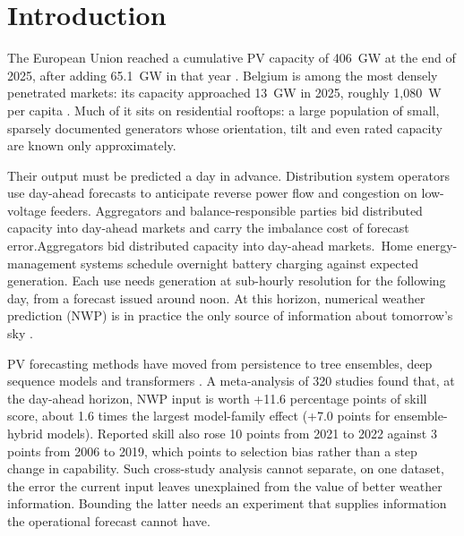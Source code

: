 \section{Introduction}
\label{sec:intro}

The European Union reached a cumulative PV capacity of 406~GW at the end of 2025, after adding 65.1~GW in that year \citep{SolarPowerEurope2025}. Belgium is among the most densely penetrated markets: its capacity approached 13~GW in 2025, roughly 1,080~W per capita \citep{IEAPVPS2026}. Much of it sits on residential rooftops: a large population of small, sparsely documented generators whose orientation, tilt and even rated capacity are known only approximately.

Their output must be predicted a day in advance. \ifepsr Distribution system operators use day-ahead forecasts to anticipate reverse power flow and congestion on low-voltage feeders. Aggregators and balance-responsible parties bid distributed capacity into day-ahead markets and carry the imbalance cost of forecast error.\else Aggregators bid distributed capacity into day-ahead markets.\fi\ Home energy-management systems schedule overnight battery charging against expected generation. Each use needs generation at sub-hourly resolution for the following day, from a forecast issued around noon. At this horizon, numerical weather prediction (NWP) is in practice the only source of information about tomorrow's sky \citep{Inman2013,Antonanzas2016}.

PV forecasting methods have moved from persistence to tree ensembles, deep sequence models and transformers \citep{Antonanzas2016,Yang2018}. A meta-analysis of 320 studies \citep{Nguyen2026} found that, at the day-ahead horizon, NWP input is worth +11.6 percentage points of skill score, about 1.6 times the largest model-family effect (+7.0 points for ensemble-hybrid models). Reported skill also rose 10 points from 2021 to 2022 against 3 points from 2006 to 2019, which points to selection bias rather than a step change in capability. Such cross-study analysis cannot separate, on one dataset, the error the current input leaves unexplained from the value of better weather information. Bounding the latter needs an experiment that supplies information the operational forecast cannot have.

